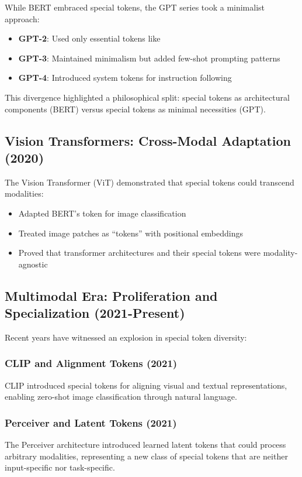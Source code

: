 While BERT embraced special tokens, the GPT series \citep{radford2019language} took a minimalist approach:

\begin{itemize}
\item \textbf{GPT-2}: Used only essential tokens like 
\item \textbf{GPT-3}: Maintained minimalism but added few-shot prompting patterns
\item \textbf{GPT-4}: Introduced system tokens for instruction following
\end{itemize}

This divergence highlighted a philosophical split: special tokens as architectural components (BERT) versus special tokens as minimal necessities (GPT).

\subsection{Vision Transformers: Cross-Modal Adaptation (2020)}

The Vision Transformer (ViT) \citep{dosovitskiy2020image} demonstrated that special tokens could transcend modalities:

\begin{itemize}
\item Adapted BERT's \cls{} token for image classification
\item Treated image patches as ``tokens'' with positional embeddings
\item Proved that transformer architectures and their special tokens were modality-agnostic
\end{itemize}

\subsection{Multimodal Era: Proliferation and Specialization (2021-Present)}

Recent years have witnessed an explosion in special token diversity:

\subsubsection{CLIP and Alignment Tokens (2021)}
CLIP \citep{radford2021learning} introduced special tokens for aligning visual and textual representations, enabling zero-shot image classification through natural language.

\subsubsection{Perceiver and Latent Tokens (2021)}
The Perceiver architecture introduced learned latent tokens that could process arbitrary modalities, representing a new class of special tokens that are neither input-specific nor task-specific.

